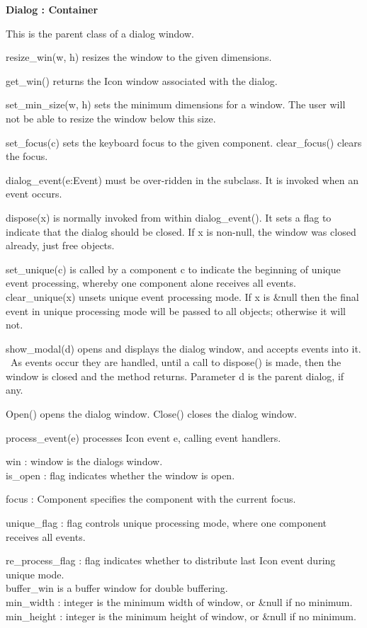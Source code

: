 {\sffamily\bfseries
{}Dialog : Container}

This is the parent class of a dialog window.

resize\_win(w, h) resizes the window to the given dimensions.

get\_win() returns the Icon window associated with the dialog.

set\_min\_size(w, h) sets the minimum dimensions for a window. The user
will not be able to resize the window below this size.

set\_focus(c) sets the keyboard focus to the given component.
clear\_focus() clears the focus.

dialog\_event(e:Event) must be over-ridden in the subclass. It is
invoked when an event occurs.

dispose(x) is normally invoked from within dialog\_event(). It sets a
flag to indicate that the dialog should be closed. If x is non-null,
the window was closed already, just free objects.

set\_unique(c) is called by a component c to indicate the beginning of
unique event processing, whereby one component alone receives all
events.\\
clear\_unique(x) unsets unique event processing mode. If x is \&null
then the final event in unique processing mode will be passed to all
objects; otherwise it will not.

show\_modal(d) opens and displays the dialog window, and accepts events
into it. \ As events occur they are handled, until a call to dispose()
is made, then the window is closed and the method returns. Parameter d
is the parent dialog, if any.

Open() opens the dialog window. Close() closes the dialog window.

process\_event(e) processes Icon event e, calling event handlers.

win : window is the dialog{\textquotesingle}s window.\\
is\_open : flag indicates whether the window is open.

focus : Component specifies the component with the current focus.

unique\_flag : flag controls unique processing mode, where one component
receives all events.

re\_process\_flag : flag indicates whether to distribute last Icon event
during unique mode.\\
buffer\_win is a buffer window for double buffering.\\
min\_width : integer is the minimum width of window, or \&null if no
minimum.\\
min\_height : integer is the minimum height of window, or \&null if no
minimum.

